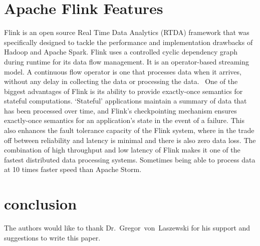 \section{Apache Flink Features}
Flink is an open source Real Time Data Analytics (RTDA) framework that was
specifically designed to tackle the performance and implementation drawbacks of
Hadoop and Apache Spark. Flink uses a controlled cyclic dependency graph during
runtime for its data flow management. It is an operator-based streaming model.
A continuous flow operator is one that processes data when it arrives, without
any delay in collecting the data or processing the data.~\cite{[2]}
One of the biggest advantages of Flink is its ability to provide exactly-once
semantics for stateful computations. ‘Stateful’ applications maintain a summary
of data that has been processed over time, and Flink’s checkpointing mechanism
ensures exactly-once semantics for an application’s state in the event of a
failure. This also enhances the fault tolerance capacity of the Flink system,
where in the trade off between reliability and latency is minimal and there is
also zero data loss.
The combination of high throughput and low latency of Flink makes it one of the
fastest distributed data processing systems. Sometimes being able to process
data at 10 times faster speed than Apache Storm.


\section{conclusion}

\begin{acks}

    The authors would like to thank Dr.~Gregor~von~Laszewski for his
    support and suggestions to write this paper.

\end{acks}


